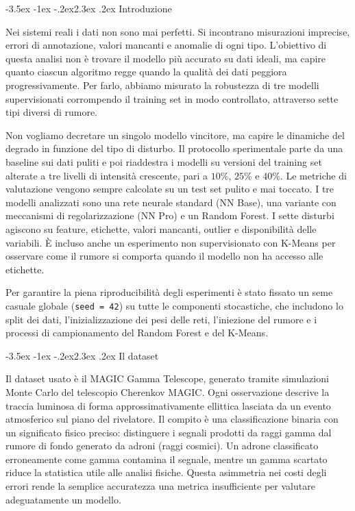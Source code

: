 \documentclass[12pt,a4paper]{article}
\makeatletter
\renewcommand\section{\@startsection{section}{1}{\z@}%
  {-3.5ex \@plus -1ex \@minus -.2ex}{2.3ex \@plus.2ex}%
  {\normalfont\Large\bfseries}}
\makeatother
\begin{document}
\section{Introduzione}\label{sec:intro}

Nei sistemi reali i dati non sono mai perfetti. Si incontrano misurazioni imprecise, errori di annotazione, valori mancanti e anomalie di ogni tipo. L'obiettivo di questa analisi non è trovare il modello più accurato su dati ideali, ma capire quanto ciascun algoritmo regge quando la qualità dei dati peggiora progressivamente. Per farlo, abbiamo misurato la robustezza di tre modelli supervisionati corrompendo il training set in modo controllato, attraverso sette tipi diversi di rumore.

Non vogliamo decretare un singolo modello vincitore, ma capire le dinamiche del degrado in funzione del tipo di disturbo. Il protocollo sperimentale parte da una baseline sui dati puliti e poi riaddestra i modelli su versioni del training set alterate a tre livelli di intensità crescente, pari a $10\%$, $25\%$ e $40\%$. Le metriche di valutazione vengono sempre calcolate su un test set pulito e mai toccato. I tre modelli analizzati sono una rete neurale standard (NN Base), una variante con meccanismi di regolarizzazione (NN Pro) e un Random Forest. I sette disturbi agiscono su feature, etichette, valori mancanti, outlier e disponibilità delle variabili. È incluso anche un esperimento non supervisionato con K-Means per osservare come il rumore si comporta quando il modello non ha accesso alle etichette.

Per garantire la piena riproducibilità degli esperimenti è stato fissato un seme casuale globale (\texttt{seed = 42}) su tutte le componenti stocastiche, che includono lo split dei dati, l'inizializzazione dei pesi delle reti, l'iniezione del rumore e i processi di campionamento del Random Forest e del K-Means.

\section{Il dataset}\label{sec:dataset}

Il dataset usato è il MAGIC Gamma Telescope, generato tramite simulazioni Monte Carlo del telescopio Cherenkov MAGIC. Ogni osservazione descrive la traccia luminosa di forma approssimativamente ellittica lasciata da un evento atmosferico sul piano del rivelatore. Il compito è una classificazione binaria con un significato fisico preciso: distinguere i segnali prodotti da raggi gamma dal rumore di fondo generato da adroni (raggi cosmici). Un adrone classificato erroneamente come gamma contamina il segnale, mentre un gamma scartato riduce la statistica utile alle analisi fisiche. Questa asimmetria nei costi degli errori rende la semplice accuratezza una metrica insufficiente per valutare adeguatamente un modello.
\end{document}
